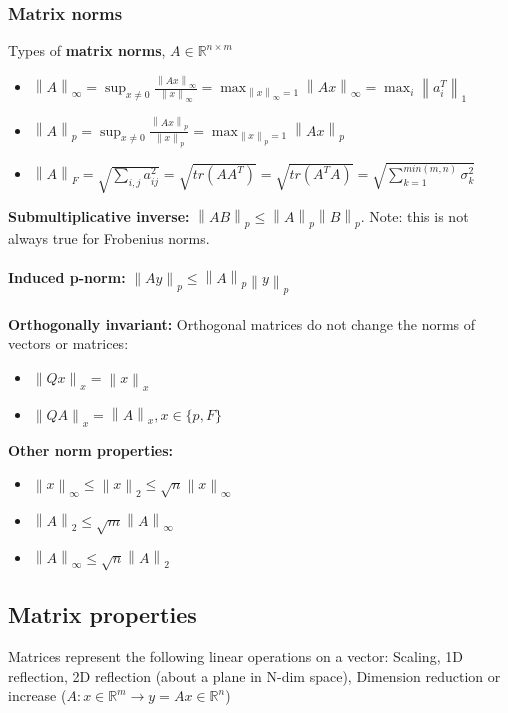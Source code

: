 \documentclass{article}
\newcommand{\norm}[2]{\left\lVert#1\right\rVert_#2}
\begin{document}
\subsubsection{Matrix norms}
\noindent Types of \textbf{matrix norms}, $A \in \mathbb{R}^{n \times m}$
\begin{itemize}
    \item $\norm{A}{\infty} = \sup_{x\neq 0}\frac{\norm{Ax}{\infty}}{\norm{x}{\infty}} = \max_{\norm{x}{\infty}=1}\norm{Ax}{\infty} = \max_i\norm{a_i^T}{1}$
    \item $\norm{A}{p} = \sup_{x\neq 0}\frac{\norm{Ax}{p}}{\norm{x}{p}} = \max_{\norm{x}{p}=1}\norm{Ax}{p}$
    \item $\norm{A}{F} = \sqrt{\sum_{i,j} a_{ij}^2} = \sqrt{tr(AA^T)} = \sqrt{tr(A^TA)} = \sqrt{\sum_{k=1}^{min(m,n)}\sigma_k^2} $
\end{itemize}
\textbf{Submultiplicative inverse:} $\norm{AB}{p} \leq \norm{A}{p}\norm{B}{p}$. Note: this is not always true for Frobenius norms.\\ \\
\textbf{Induced p-norm: } $\norm{Ay}{p} \leq \norm{A}{p}\norm{y}{p}$\\ \\
\textbf{Orthogonally invariant:} Orthogonal matrices do not change the norms of vectors or matrices:
\begin{itemize}
    \item $\norm{Qx}{x} = \norm{x}{x}$
    \item $\norm{QA}{x} = \norm{A}{x}, x \in \{p, F\}$
\end{itemize}

\textbf{Other norm properties:}
\begin{itemize}
    \item $\norm{x}{\infty} \leq \norm{x}{2} \leq \sqrt{n}\norm{x}{\infty}$
    \item $\norm{A}{2} \leq \sqrt{m}\norm{A}{\infty}$
    \item $\norm{A}{\infty} \leq \sqrt{n}\norm{A}{2}$
\end{itemize}

\subsection{Matrix properties}
Matrices represent the following linear operations on a vector: Scaling, 1D reflection, 2D reflection (about a plane in N-dim space), Dimension reduction or increase ($A: x\in \mathbb{R}^m \rightarrow y = Ax \in \mathbb{R}^n$)
\end{document}
